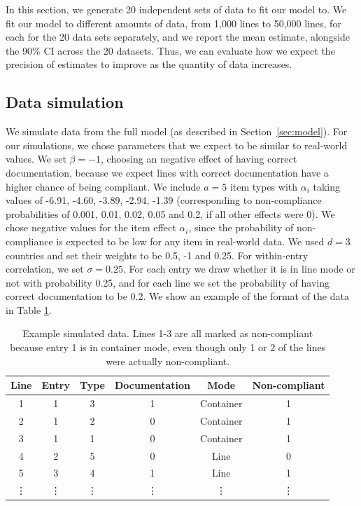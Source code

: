 \documentclass[aoas]{imsart}
\begin{document}
In this section, we generate 20 independent sets of data to fit our model to. We fit our model to different amounts of data, from 1,000 lines to 50,000 lines, for each for the 20 data sets separately, and we report the mean estimate, alongside the 90\% CI across the 20 datasets. Thus, we can evaluate how we expect the precision of estimates to improve as the quantity of data increases.

\subsection{Data simulation}
We simulate data from the full model (as described in Section~\ref{sec:model}). For our simulations, we chose parameters that we expect to be similar to real-world values. We set \(\beta=-1\), choosing an negative effect of having correct documentation, because we expect lines with correct documentation have a higher chance of being compliant. We include $a=5$ item types with \(\alpha_i\) taking values of -6.91, -4.60, -3.89, -2.94, -1.39 (corresponding to non-compliance probabilities of 0.001, 0.01, 0.02, 0.05 and 0.2, if all other effects were 0). We chose negative values for the item effect $\alpha_i$, since the probability of non-compliance is expected to be low for any item in real-world data. We used $d=3$ countries and set their weights to be 0.5, -1 and 0.25.
For within-entry correlation, we set \(\sigma = 0.25\). For each entry we draw whether it is in line mode or not with probability 0.25, and for each line we set the probability of having correct documentation to be 0.2. We show an example of the format of the data in Table \ref{table:example_data}.



\vspace{0.1cm}
\begin{table}[h]
\caption{Example simulated data. Lines 1-3 are all marked as non-compliant because entry 1 is in container mode, even though only 1 or 2 of the lines were actually non-compliant.}
\label{table:example_data}
\begin{center}

\begin{tabular}{|c|c|c|c|c|c|}
\hline 
Line & Entry & Type & Documentation & Mode & Non-compliant \\ 
\hline 
1 & 1 & 3 & 1  & Container & 1 \\ 
\hline 
2 & 1 & 2 & 0  & Container & 1 \\ 
\hline 
3 & 1 & 1 & 0 & Container & 1 \\ 
\hline 
4 & 2 & 5 & 0 &Line & 0 \\ 
\hline 
5 & 3 & 4 & 1 &Line & 1 \\ 
\hline 
\vdots & \vdots & \vdots & \vdots & \vdots & \vdots \\ 
\hline 
\end{tabular} 

\end{center}
\end{table}
\end{document}
